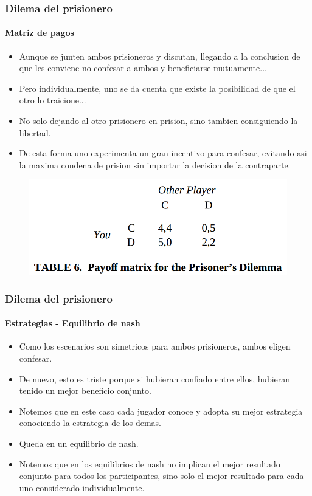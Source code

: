 \documentclass{beamer}
\begin{document}
\begin{frame}
    \frametitle{Dilema del prisionero}
  \framesubtitle{Matriz de pagos}
  \begin{itemize}
    \setlength{\itemsep}{4pt}
    \item Aunque se junten ambos prisioneros y discutan, llegando a la conclusion de que les conviene no confesar a ambos y beneficiarse mutuamente...
    \pause
    \item Pero individualmente, uno se da cuenta que existe la posibilidad de que el otro lo traicione...
    \pause 
    \item No solo dejando al otro prisionero en prision, sino tambien consiguiendo la libertad. 
    \pause
    \item De esta forma uno experimenta un gran incentivo para confesar, evitando asi la maxima condena de prision sin importar la decision de la contraparte.
    \pause
  \end{itemize}

  \begin{figure}[h!]
      \centering        
      \includegraphics[scale=0.20]{fig/matrizpagos-prisionero.png}
  \end{figure}

\end{frame}

\begin{frame}
    \frametitle{Dilema del prisionero}
  \framesubtitle{Estrategias - Equilibrio de nash}
  \begin{itemize}
    \setlength{\itemsep}{4pt}
    \item Como los escenarios son simetricos para ambos prisioneros, ambos eligen confesar.
    \pause
    \item De nuevo, esto es triste porque si hubieran confiado entre ellos, hubieran tenido un mejor beneficio conjunto.
    \pause 
    \item Notemos que en este caso cada jugador conoce y adopta su mejor estrategia conociendo la estrategia de los demas.
    \pause
    \item Queda en un equilibrio de nash.
    \pause
    \item Notemos que en los equilibrios de nash no implican el mejor resultado conjunto para todos los participantes, sino solo el mejor resultado para cada uno considerado individualmente.
  \end{itemize}
\end{frame}
\end{document}
